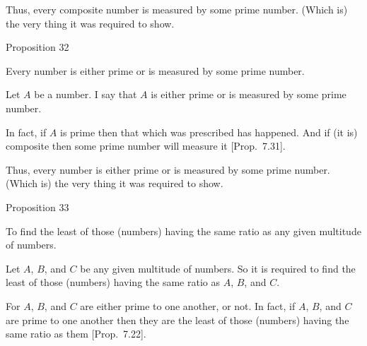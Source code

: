 \epsfysize=0.9in
\centerline{}

Thus, every composite number is measured by some prime number.
(Which is) the very thing it was required to show.


\begin{center}
{\large Proposition 32}
\end{center}

Every number is either prime or
is measured by some prime number.

\epsfysize=0.2in
\centerline{}

Let $A$ be a number. I say that $A$ is either prime or is measured by some
prime number.

In fact, if $A$ is prime then that which was prescribed has happened.
And if (it is) composite then  some
prime number  will measure it [Prop.~7.31].

Thus, every number is either prime or
is measured by some prime number. (Which is) the very thing it was required to
show.


\begin{center}
{\large Proposition 33}
\end{center}

To  find the least of those (numbers) having the
same ratio as any given multitude of numbers.

Let $A$, $B$, and $C$ be any given multitude of numbers. So it is required to
find the least of those (numbers) having the same ratio as $A$, $B$, and $C$.

For $A$, $B$, and $C$ are either prime to one another, or not. In fact,
if $A$, $B$, and $C$ are prime to one another then they are the least of those (numbers)
having the same ratio as them [Prop.~7.22].

\epsfysize=1.3in
\centerline{}

